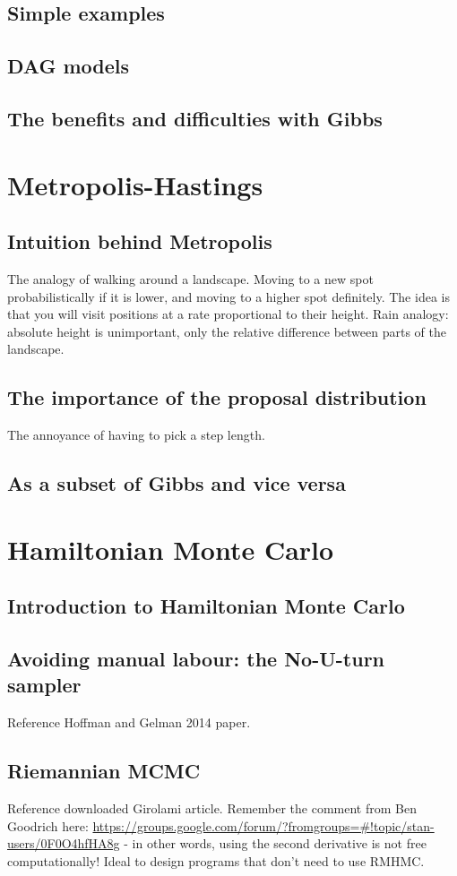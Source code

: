 \documentclass[11pt,fullpage]{book}
\begin{document}
\section{Simple examples}
\section{DAG models}
\section{The benefits and difficulties with Gibbs}

\chapter{Metropolis-Hastings}
\section{Intuition behind Metropolis}
The analogy of walking around a landscape. Moving to a new spot probabilistically if it is lower, and moving to a higher spot definitely. The idea is that you will visit positions at a rate proportional to their height. Rain analogy: absolute height is unimportant, only the relative difference between parts of the landscape.
\section{The importance of the proposal distribution}
The annoyance of having to pick a step length.

\section{As a subset of Gibbs and vice versa}

\chapter{Hamiltonian Monte Carlo}
\section{Introduction to Hamiltonian Monte Carlo}
\section{Avoiding manual labour: the No-U-turn sampler}
Reference Hoffman and Gelman 2014 paper.
\section{Riemannian MCMC}
Reference downloaded Girolami article.
Remember the comment from Ben Goodrich here: \url{https://groups.google.com/forum/?fromgroups=#!topic/stan-users/0F0O4hfHA8g} - in other words, using the second derivative is not free computationally! Ideal to design programs that don't need to use RMHMC.
\end{document}

